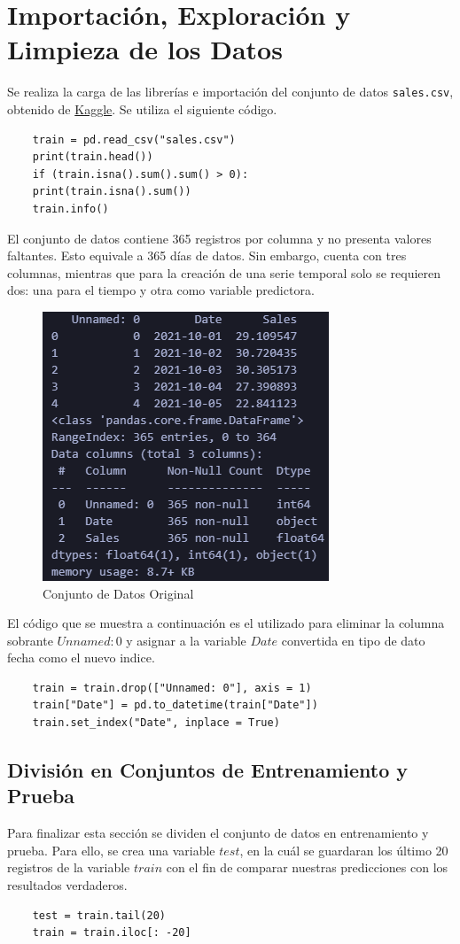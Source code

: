 \section{Importación, Exploración y Limpieza de los Datos} \label{section:depuracion}

Se realiza la carga de las librerías e importación del conjunto de datos \texttt{sales.csv}, obtenido de \href{https://www.kaggle.com/datasets/sudipmanchare/simulated-sales-data-with-timeseries-features}{Kaggle}. Se utiliza el siguiente código.

\begin{lstlisting}
	train = pd.read_csv("sales.csv")
	print(train.head())
	if (train.isna().sum().sum() > 0):
	print(train.isna().sum())
	train.info()
\end{lstlisting}

El conjunto de datos contiene 365 registros por columna y no presenta valores faltantes. Esto equivale a 365 días de datos.
 Sin embargo, cuenta con tres columnas, mientras que para la creación de una serie temporal solo se requieren dos: una para el tiempo y otra como variable predictora.\\

\begin{figure}[h]
	\centering
	\includegraphics[width=0.3\linewidth]{train_info}
	\caption{Conjunto de Datos Original}
	\label{fig:traininfo}
\end{figure}

El código que se muestra a continuación es el utilizado para eliminar la columna sobrante $Unnamed: 0$ y asignar a la variable $Date$ convertida en tipo de dato fecha como el nuevo indice.

\begin{lstlisting}
	train = train.drop(["Unnamed: 0"], axis = 1)
	train["Date"] = pd.to_datetime(train["Date"])
	train.set_index("Date", inplace = True)
\end{lstlisting}

\subsection{División en Conjuntos de Entrenamiento y Prueba}

Para finalizar esta sección se dividen el conjunto de datos en entrenamiento y prueba. Para ello, se crea una variable $test$, en la cuál se guardaran los último 20 registros de la variable $train$ con el fin de comparar nuestras predicciones con los resultados verdaderos.

\begin{lstlisting}
	test = train.tail(20)
	train = train.iloc[: -20]
\end{lstlisting}